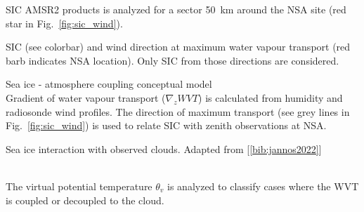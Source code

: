 \documentclass[portrate,a0paper,fontscale=0.4,margin=1cm]{baposter}
\begin{document}
\begin{poster}
{\colouredcircle SIC AMSR2 products is analyzed for a sector 50~km around the NSA site (red star in Fig.~\ref{fig:sic_wind}).\\
\begin{minipage}{0.95\textwidth}
	\centering
	\caption{\small SIC (see colorbar) and wind direction at maximum water vapour transport (red barb indicates NSA location). Only SIC from those directions are considered.}
	\label{fig:sic_wind}
\end{minipage}

\colouredcircle Sea ice - atmosphere coupling conceptual model\\
Gradient of water vapour transport ($\nabla_z WVT$) is calculated from humidity and radiosonde wind profiles. The direction of maximum transport (see grey lines in Fig.~\ref{fig:sic_wind}) is used to relate SIC with zenith observations at NSA.
\begin{minipage}{0.9\textwidth}
	\centering
	\caption{\smaller Sea ice interaction with observed clouds. Adapted from [\ref{bib:jannos2022}]}
	\label{fig:leadcloud}
\end{minipage}\\

The virtual potential temperature $\theta_v$ is analyzed to classify cases where the WVT is coupled or decoupled to the cloud.

}
\end{poster}
\end{document}
